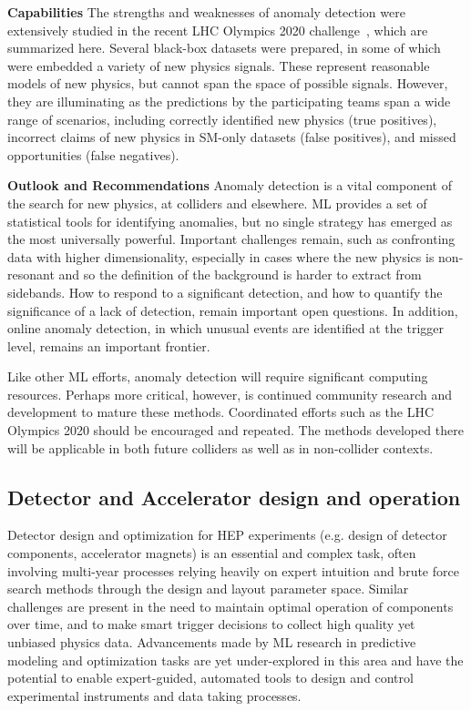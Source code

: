\documentclass[submission,Phys]{SciPost}
\begin{document}
{\bf Capabilities} The strengths and weaknesses of anomaly detection were extensively studied in the recent LHC Olympics 2020 challenge~\cite{Kasieczka:2021xcg}, which are summarized here.  Several black-box datasets were prepared, in some of which were embedded a variety of new physics signals.  These represent reasonable models of new physics, but cannot span the space of possible signals.  However, they are illuminating as the predictions by the participating teams span a wide range of scenarios, including correctly identified new physics (true positives), incorrect claims of new physics in SM-only datasets (false positives), and missed opportunities (false negatives).

{\bf Outlook and Recommendations} Anomaly detection is a vital component of the search for new physics, at colliders and elsewhere. ML provides a set of  statistical tools for identifying anomalies, but no single strategy has emerged as the most universally powerful.  Important challenges remain, such as confronting data with higher dimensionality, especially in cases where the new physics is non-resonant and so the definition of the background is harder to extract from sidebands. How to respond to a significant detection, and how to quantify the significance of a lack of detection, remain important open questions. In addition, online anomaly detection, in which unusual events are identified at the trigger level, remains an important frontier. 

Like other ML efforts, anomaly detection will require significant computing resources.  Perhaps more critical, however, is continued community research and development to mature these methods.  Coordinated efforts such as the LHC Olympics 2020 should be encouraged and repeated. The methods developed there will be applicable in both future colliders as well as in non-collider contexts.


\subsection{Detector and Accelerator design and operation}
Detector design and optimization for HEP experiments (e.g. design of detector components, accelerator magnets) is an essential and complex task, often involving multi-year processes relying heavily on expert intuition and brute force search methods through the design and layout parameter space. Similar challenges are present in the need to maintain optimal operation of components over time, and to make smart trigger decisions to collect high quality yet unbiased physics data. Advancements made by ML research in predictive modeling and optimization tasks are yet under-explored in this area and have the potential to enable expert-guided, automated tools to design and control experimental instruments and data taking processes.
\end{document}
